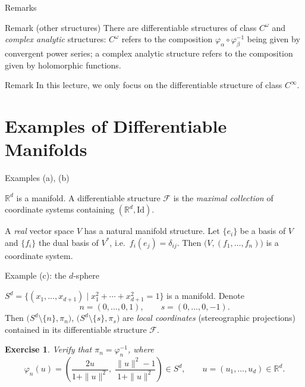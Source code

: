 \documentclass[10pt]{beamer}
\newtheorem{exercise}{Exercise}
\newcommand{\R}{\mathbb{R}}
\newcommand{\F}{\mathcal{F}}
\begin{document}
\begin{frame}{Remarks}
	\begin{block}{Remark (other structures)}
		There are differentiable structures of class $C^\omega$ and
		\emph{complex analytic} structures: $C^\omega$ refers to the composition
		$\varphi_\alpha \circ \varphi_\beta^{-1}$ being given by convergent
		power series; a complex analytic structure refers to the composition
		given by holomorphic functions.
	\end{block}
	\begin{alertblock}{Remark}
		In this lecture, we only focus on the differentiable structure of class
		$C^\infty$.
	\end{alertblock}
\end{frame}

\section{Examples of Differentiable Manifolds}

\begin{frame}{Examples (a), (b)}
	\begin{example}
		$\R^d$ is a manifold. A differentiable structure $\F$ is the
		\emph{maximal collection} of coordinate systems containing
		$(\R^d, \mathrm{Id})$.
	\end{example}
	\begin{example}
		A \emph{real} vector space $V$ has a natural manifold structure. Let
		$\{e_i\}$ be a basis of $V$ and $\{f_i\}$ the dual basis of $V^*$,
		i.e.\ $f_i(e_j) = \delta_{ij}$. Then $\bigl(V, (f_1, \dots, f_n)\bigr)$
		is a coordinate system.
	\end{example}
\end{frame}

\begin{frame}{Example (c): the $d$-sphere}
	\begin{example}
		$S^d = \{(x_1, \dots, x_{d+1}) \mid x_1^2 + \cdots + x_{d+1}^2 = 1\}$
		is a manifold. Denote
		\[
			n = (0, \dots, 0, 1), \qquad s = (0, \dots, 0, -1).
		\]
		Then $\bigl(S^d \setminus \{n\}, \pi_n\bigr)$,
		$\bigl(S^d \setminus \{s\}, \pi_s\bigr)$ are \emph{local coordinates}
		(stereographic projections) contained in its differentiable structure
		$\F$.
	\end{example}
	\begin{exercise}
		Verify that $\pi_n = \varphi_n^{-1}$, where
		\[
			\varphi_n(u) = \left( \frac{2u}{1 + \|u\|^2},\;
			\frac{\|u\|^2 - 1}{1 + \|u\|^2} \right) \in S^d,
			\qquad u = (u_1, \dots, u_d) \in \R^d .
		\]
	\end{exercise}
\end{frame}
\end{document}

